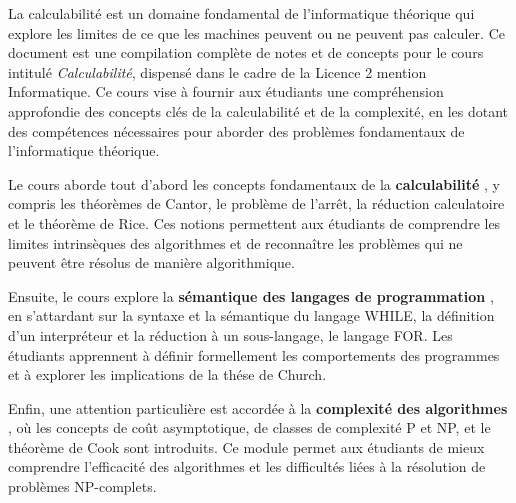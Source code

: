  \label{ch:Introduction}


La calculabilit\'e est un domaine fondamental de l'informatique th\'eorique qui explore les limites de ce que les machines peuvent ou ne peuvent pas calculer. Ce document est une compilation compl\`ete de notes et de concepts pour le cours intitul\'e \emph{Calculabilit\'e}, dispens\'e dans le cadre de la Licence 2 mention Informatique. Ce cours vise \`a fournir aux \'etudiants une compr\'ehension approfondie des concepts cl\'es de la calculabilit\'e et de la complexit\'e, en les dotant des comp\'etences n\'ecessaires pour aborder des probl\`emes fondamentaux de l'informatique th\'eorique.

Le cours aborde tout d'abord les concepts fondamentaux de la \textbf{calculabilit\'e }, y compris les th\'eor\`emes de Cantor, le probl\`eme de l'arr\^et, la r\'eduction calculatoire et le th\'eor\`eme de Rice. Ces notions permettent aux \'etudiants de comprendre les limites intrins\`eques des algorithmes et de reconna\^itre les probl\`emes qui ne peuvent \^etre r\'esolus de mani\`ere algorithmique.

Ensuite, le cours explore la \textbf{s\'emantique des langages de programmation }, en s'attardant sur la syntaxe et la s\'emantique du langage WHILE, la d\'efinition d'un interpr\'eteur et la r\'eduction \`a un sous-langage, le langage FOR. Les \'etudiants apprennent \`a d\'efinir formellement les comportements des programmes et \`a explorer les implications de la th\'ese de Church.

Enfin, une attention particuli\`ere est accord\'ee \`a la \textbf{complexit\'e des algorithmes }, o\`u les concepts de co\^ut asymptotique, de classes de complexit\'e P et NP, et le th\'eor\`eme de Cook sont introduits. Ce module permet aux \'etudiants de mieux comprendre l'efficacit\'e des algorithmes et les difficult\'es li\'ees \`a la r\'esolution de probl\`emes NP-complets.
